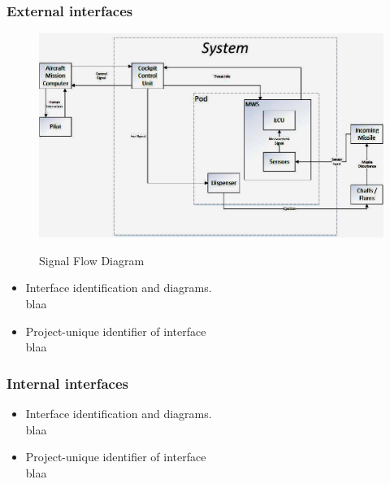 \subsubsection{External interfaces}
\begin{figure}[h]
	\centering
	\includegraphics[scale=0.5]{./images/SignalFlowDiagram}\\
	\caption{Signal Flow Diagram}
    \label{fig:sigFlowDiagram}
\end{figure}
\begin{itemize}
\item {Interface identification and diagrams.}\\
blaa
\item {Project-unique identifier of interface}\\
blaa
\end{itemize}
\subsubsection{Internal interfaces}
\begin{itemize}
\item{Interface identification and diagrams.}\\
blaa
\item{Project-unique identifier of interface}\\
blaa
\end{itemize}